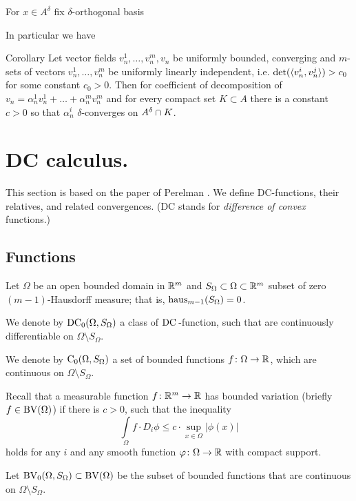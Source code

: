 For $x\in A^\delta$ fix $\delta$-orthogonal basis





In particular we have
\begin{thm}{Corollary}\label{cor:cdeltacoeff}
Let vector fields $v_n^1,\dots, v_n^m, v_n$ be
uniformly bounded, converging
 and $m$-sets of vectors
$v_n^1,\dots, v_n^m$ be uniformly linearly independent,
i.e. $\det(\langle v_n^i, v_n^j\rangle)>c_0$
for some constant $c_0>0$.
Then for coefficient of decomposition
of $v_n=\alpha_n^1 v_n^1+\dots+\alpha_n^m v_n^m$
 and for every compact
set $K\subset A$ there is a constant $c>0$ so that
$\alpha_n^i$ $\delta$-converges on $A^\delta\cap K$.
\end{thm}

\section{DC calculus.}\label{sec:DC}

This section is based on the paper of Perelman \cite{PerDC}.
We define DC-functions, their relatives, and related convergences.
(DC stands for \emph{difference of convex} functions.)

\subsection{Functions}

Let $\Omega$ be an open bounded domain in $\mathbb{R}^m$
and $S_\Omega\subset\Omega\subset\mathbb{R}^m $ subset of
zero $(m-1)$-Hausdorff measure; that is, $\operatorname{\rm haus}_{m-1}(S_\Omega)=0$.

We denote by  $\operatorname{DC_0}(\Omega,S_\Omega)$ a class of
 $\mathrm{DC\,}$-function, such  that are continuously differentiable on
$\Omega\setminus S_\Omega$.

We denote by $\operatorname{C_0}(\Omega,S_\Omega)$ a set of bounded functions
$f\colon\Omega\to\mathbb{R}$, which are continuous on $\Omega\setminus S_\Omega$.

Recall that a measurable function $f\colon\mathbb{R}^m\to \mathbb{R}$ has bounded variation
 (briefly $f\in\operatorname{BV}(\Omega)$) if there is  $c>0$,
such that  the inequality
$$\int\limits_\Omega f\cdot D_i\phi
\le
 c\cdot\sup_{x\in\Omega}|\phi(x)|$$
holds
for any $i$ and any smooth function $\varphi\colon\Omega\to \mathbb{R}$ with compact support.

Let $\operatorname{BV_0}(\Omega,S_\Omega)\subset \operatorname{BV}(\Omega)$ be the subset of bounded functions that are continuous on $\Omega\setminus S_\Omega$.


